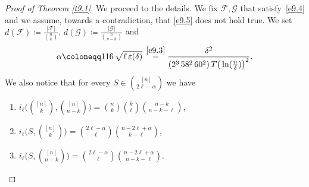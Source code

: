 \documentclass[10pt,a4paper]{amsart}
\theoremstyle{remark}
\newcommand{\Fcal}{\mathcal{F}}
\newcommand{\Gcal}{\mathcal{G}}
\begin{document}
\begin{proof}[Proof of Theorem \emph{\ref{t9.1}}]
We proceed to the details. We fix $\Fcal,\Gcal$ that satisfy~\eqref{e9.4} and we assume, towards a contradiction,
that \eqref{e9.5} does not hold true. We set $d(\Fcal)\coloneqq \frac{|\Fcal|}{\binom{n}{k}}$,
$d(\Gcal)\coloneqq\frac{|\Gcal|}{\binom{n}{n-k}}$ and
\begin{equation} \label{e9.6}
\alpha\coloneqq 116\, \sqrt{\ell\,\varepsilon(\delta)}\, \stackrel{\eqref{e9.3}}{=}
\frac{\delta^2}{(2^3\,58^2\,60^2) \, T \big(\ln(\frac{n}{\delta})\big)^2}.
\end{equation}
We also notice that for every $S\in\binom{[n]}{2\ell-\alpha}$ we have
\begin{enumerate}
\item[$\bullet$] $i_{\ell}\big( \binom{[n]}{k},\binom{[n]}{n-k}\big)=\binom{n}{k}\binom{k}{\ell}\binom{n-k}{n-k-\ell}$,
\item[$\bullet$] $i_{\ell}\big(S,\binom{[n]}{k}\big)=\binom{2\ell-\alpha}{\ell}\binom{n-2\ell+\alpha}{k-\ell}$,
\item[$\bullet$] $i_{\ell}\big(S,\binom{[n]}{n-k}\big)=\binom{2\ell-\alpha}{\ell}\binom{n-2\ell+\alpha}{n-k-\ell}$.
\end{enumerate}


\end{proof}
\end{document}
